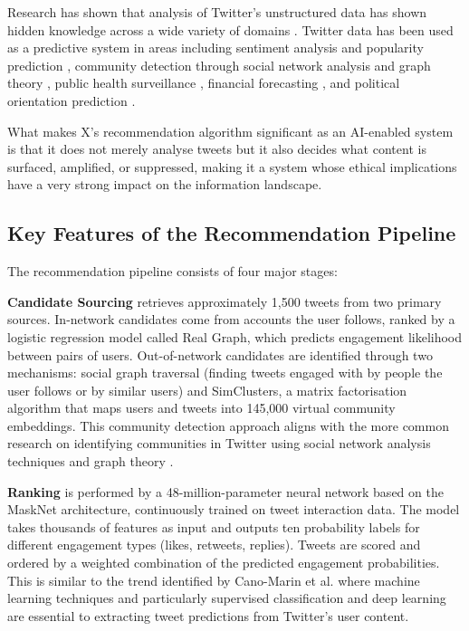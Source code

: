 \documentclass[]
{UCD_CS_41820_Report}
\begin{document}
Research has shown that analysis of Twitter's unstructured data has shown hidden knowledge across a wide variety of domains \cite{canomarin2023}. Twitter data has been used as a predictive system in areas including sentiment analysis and popularity prediction \cite{asur2010, hong2011}, community detection through social network analysis and graph theory \cite{pei2014, gadek2017}, public health surveillance \cite{signorini2011, santillana2015}, financial forecasting \cite{bollen2011, shen2019}, and political orientation prediction \cite{colleoni2014, tumasjan2011}.

What makes X's recommendation algorithm significant as an AI-enabled system is that it does not merely analyse tweets but it also decides what content is surfaced, amplified, or suppressed, making it a system whose ethical implications have a very strong impact on the information landscape.

\subsection{Key Features of the Recommendation Pipeline}

The recommendation pipeline consists of four major stages:

\textbf{Candidate Sourcing} retrieves approximately 1,500 tweets from two primary sources. In-network candidates come from accounts the user follows, ranked by a logistic regression model called Real Graph, which predicts engagement likelihood between pairs of users. Out-of-network candidates are identified through two mechanisms: social graph traversal (finding tweets engaged with by people the user follows or by similar users) and SimClusters, a matrix factorisation algorithm that maps users and tweets into 145,000 virtual community embeddings. This community detection approach aligns with the more common research on identifying communities in Twitter using social network analysis techniques and graph theory \cite{gadek2017, cheng2014}.

\textbf{Ranking} is performed by a 48-million-parameter neural network based on the MaskNet architecture, continuously trained on tweet interaction data. The model takes thousands of features as input and outputs ten probability labels for different engagement types (likes, retweets, replies). Tweets are scored and ordered by a weighted combination of the predicted engagement probabilities. This is similar to the trend identified by Cano-Marin et al. \cite{canomarin2023} where machine learning techniques and particularly supervised classification and deep learning are essential to extracting tweet predictions from Twitter's user content.
\end{document}
